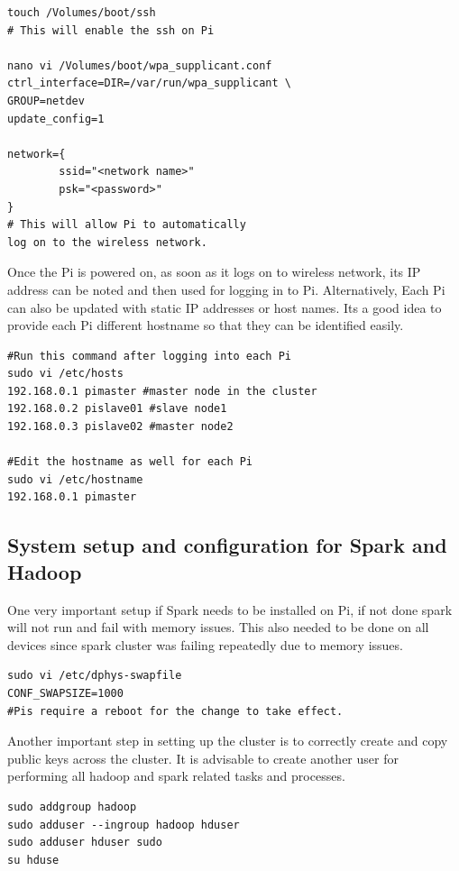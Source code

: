 \begin{verbatim}
touch /Volumes/boot/ssh
# This will enable the ssh on Pi

nano vi /Volumes/boot/wpa_supplicant.conf
ctrl_interface=DIR=/var/run/wpa_supplicant \
GROUP=netdev
update_config=1

network={
        ssid="<network name>"
        psk="<password>"
}
# This will allow Pi to automatically 
log on to the wireless network.

\end{verbatim}

Once the Pi is powered on, as soon as it logs on to wireless network,
its IP address can be noted and then used for logging in to
Pi. Alternatively, Each Pi can also be updated with static IP
addresses or host names. Its a good idea to provide each Pi different
hostname so that they can be identified easily.

\begin{verbatim}
#Run this command after logging into each Pi
sudo vi /etc/hosts
192.168.0.1 pimaster #master node in the cluster
192.168.0.2 pislave01 #slave node1 
192.168.0.3 pislave02 #master node2 

#Edit the hostname as well for each Pi
sudo vi /etc/hostname
192.168.0.1	pimaster
\end{verbatim}

\subsection{System setup and configuration for Spark and Hadoop}

One very important setup if Spark needs to be installed on Pi, if not
done spark will not run and fail with memory issues. This also needed
to be done on all devices since spark cluster was failing repeatedly
due to memory issues.

\begin{verbatim}
sudo vi /etc/dphys-swapfile
CONF_SWAPSIZE=1000
#Pis require a reboot for the change to take effect.
\end{verbatim}

Another important step in setting up the cluster is to correctly
create and copy public keys across the cluster. It is advisable to
create another user for performing all hadoop and spark related tasks
and processes.

\begin{verbatim}
sudo addgroup hadoop
sudo adduser --ingroup hadoop hduser
sudo adduser hduser sudo
su hduse
\end{verbatim}

